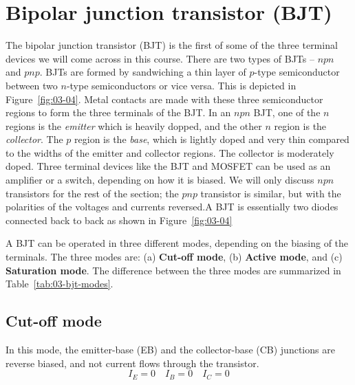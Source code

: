 \section{Bipolar junction transistor (BJT)}
The bipolar junction transistor (BJT) is the first of some of the three terminal devices we will come across in this course. There are two types of BJTs -- $npn$ and $pnp$. BJTs are formed by sandwiching a thin layer of $p$-type semiconductor between two $n$-type semiconductors or vice versa. This is depicted in Figure~\ref{fig:03-04}. Metal contacts are made with these three semiconductor regions to form the three terminals of the BJT. In an $npn$ BJT, one of the  $n$ regions is the \textit{emitter} which is heavily dopped, and the other $n$ region is the \textit{collector}. The $p$ region is the \textit{base}, which is lightly doped and very thin compared to the widths of the emitter and collector regions. The collector is moderately doped. Three terminal devices like the BJT and MOSFET can be used as an amplifier or a switch, depending on how it is biased. We will only discuss $npn$ transistors for the rest of the section; the $pnp$ transistor is similar, but with the polarities of the voltages and currents reversed.A BJT is essentially two diodes connected back to back as shown in Figure~\ref{fig:03-04}

A BJT can be operated in three different modes, depending on the biasing of the terminals. The three modes are: (a) \textbf{Cut-off mode}, (b) \textbf{Active mode}, and (c) \textbf{Saturation mode}. The difference between the three modes are summarized in Table~\ref{tab:03-bjt-modes}.
\subsection{Cut-off mode}
In this mode, the emitter-base (EB) and the collector-base (CB) junctions are reverse biased, and not current flows through the transistor.
\begin{equation}
    I_E = 0 \quad I_B = 0 \quad I_C = 0
    \label{eq:03-bjt-cutoff}
\end{equation}
